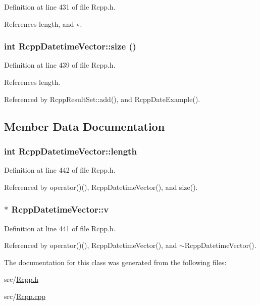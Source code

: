 Definition at line 431 of file Rcpp.h.

References length, and v.\hypertarget{classRcppDatetimeVector_8ca7268098fb2b9250523c4e2ef3c8b7}{
\subsubsection[{size}]{\setlength{\rightskip}{0pt plus 5cm}int RcppDatetimeVector::size ()}}
\label{classRcppDatetimeVector_8ca7268098fb2b9250523c4e2ef3c8b7}




Definition at line 439 of file Rcpp.h.

References length.

Referenced by RcppResultSet::add(), and RcppDateExample().

\subsection{Member Data Documentation}
\hypertarget{classRcppDatetimeVector_e131031fcf2e65b7bfeee3d8e25c4f8c}{
\subsubsection[{length}]{\setlength{\rightskip}{0pt plus 5cm}int {\bf RcppDatetimeVector::length}}}
\label{classRcppDatetimeVector_e131031fcf2e65b7bfeee3d8e25c4f8c}




Definition at line 442 of file Rcpp.h.

Referenced by operator()(), RcppDatetimeVector(), and size().\hypertarget{classRcppDatetimeVector_0138476000351892e9ec591b2c9ec02f}{
\subsubsection[{v}]{$\ast$ {\bf RcppDatetimeVector::v}}}
\label{classRcppDatetimeVector_0138476000351892e9ec591b2c9ec02f}




Definition at line 441 of file Rcpp.h.

Referenced by operator()(), RcppDatetimeVector(), and $\sim$RcppDatetimeVector().

The documentation for this class was generated from the following files:\begin{CompactItemize}
\item 
src/\hyperlink{Rcpp_8h}{Rcpp.h}\item 
src/\hyperlink{Rcpp_8cpp}{Rcpp.cpp}\end{CompactItemize}
